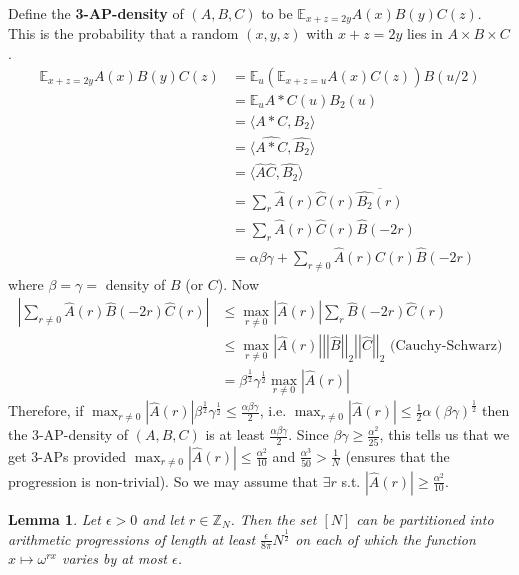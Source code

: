 \documentclass[a4paper]{article}
\newtheorem{lemma}{Lemma}
\newcommand*\conj[1]{\overline{#1}}
\newcommand*\abs[1]{\left|#1\right|}
\newcommand*\norm[1]{\abs{\abs{#1}}}
\begin{document}
Define the \textbf{3-AP-density} of $(A, B, C)$ to be $\mathbb{E}_{x+z=2y}A(x)B(y)C(z)$. This is the probability that a random $(x, y, z)$ with $x+z=2y$ lies in $A \times B \times C$.
\begin{align*}
	\mathbb{E}_{x+z=2y}A(x)B(y)C(z) & = \mathbb{E}_u\left(\mathbb{E}_{x+z=u}A(x)C(z)\right)B(u/2)\\
	&= \mathbb{E}_u A*C(u)B_2(u) \\
	&= \langle A*C, B_2 \rangle \\
	&= \langle \widehat{A*C}, \hat{B_2} \rangle \\
	&= \langle \hat{A}\hat{C}, \hat{B_2} \rangle \\
	&= \sum_r\hat{A}(r)\hat{C}(r)\conj{\hat{B_2}(r)} \\
	&= \sum_r\hat{A}(r)\hat{C}(r)\hat{B}(-2r) \\
	&= \alpha\beta\gamma + \sum_{r\neq 0}\hat{A}(r)\hat{C}(r)\hat{B}(-2r)
\end{align*}
where $\beta=\gamma=$ density of $B$ (or $C$). Now
\begin{align*}
	\abs{\sum_{r\neq 0}\hat{A}(r)\hat{B}(-2r)\hat{C}(r)} &\leq \max_{r\neq 0}\abs{\hat{A}(r)}\sum_r\hat{B}(-2r)\hat{C}(r)\\
	&\leq \max_{r \neq 0}\abs{\hat{A}(r)}\norm{\hat{B}}_2\norm{\hat{C}}_2 \text{ (Cauchy-Schwarz)}\\
	&= \beta^{\frac{1}{2}}\gamma^{\frac{1}{2}}\max_{r \neq 0}\abs{\hat{A}(r)}
\end{align*}
Therefore, if $\max_{r \neq 0}\abs{\hat{A}(r)}\beta^{\frac{1}{2}}\gamma^{\frac{1}{2}} \leq \frac{\alpha\beta\gamma}{2}$, i.e. $\max_{r \neq 0}\abs{\hat{A}(r)} \leq \frac{1}{2}\alpha(\beta\gamma)^{\frac{1}{2}}$ then the 3-AP-density of $(A, B, C)$ is at least $\frac{\alpha\beta\gamma}{2}$. Since $\beta\gamma \geq \frac{\alpha^2}{25}$, this tells us that we get 3-APs provided $\max_{r \neq 0}\abs{\hat{A}(r)} \leq \frac{\alpha^2}{10}$ and $\frac{\alpha^3}{50} > \frac{1}{N}$ (ensures that the progression is non-trivial). So we may assume that $\exists r$ s.t. $\abs{\hat{A}(r)} \geq \frac{\alpha^2}{10}$.

\begin{lemma}
	Let $\epsilon > 0$ and let $r \in \mathbb{Z}_N$. Then the set $[N]$ can be partitioned into arithmetic progressions of length at least $\frac{\epsilon}{8\pi}N^{\frac{1}{2}}$ on each of which the function $x \mapsto \omega^{rx}$ varies by at most $\epsilon$.
\end{lemma}
\end{document}
